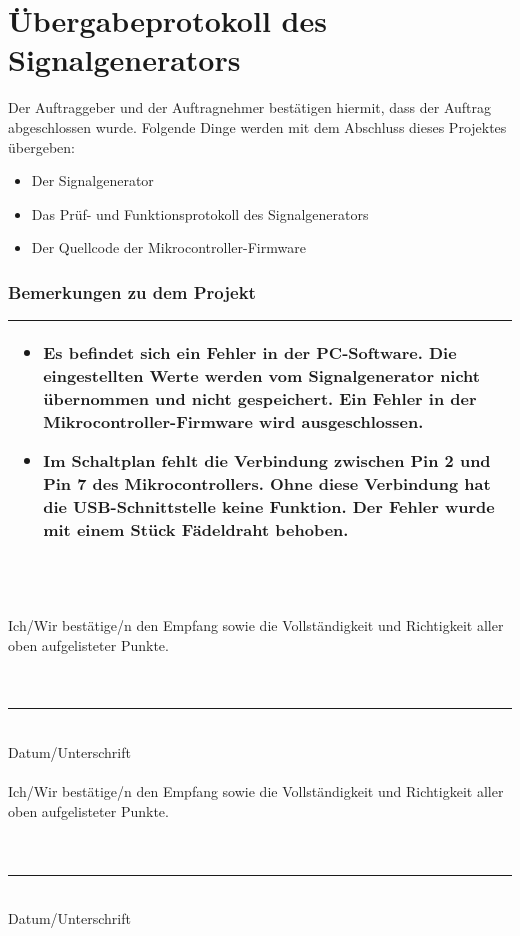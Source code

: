 \section[Übergabeprotokoll, Teilauftrag Signalgenerator]{Übergabeprotokoll des Signalgenerators}
\bigskip
Der Auftraggeber und der Auftragnehmer bestätigen hiermit, dass der Auftrag abgeschlossen wurde. Folgende Dinge werden mit dem Abschluss dieses Projektes übergeben:
\begin{itemize}
\item Der Signalgenerator
\item Das Prüf- und Funktionsprotokoll des Signalgenerators
\item Der Quellcode der Mikrocontroller-Firmware
\end{itemize}
\bigskip
\subsubsection*{Bemerkungen zu dem Projekt}

\begin{tabular}{|p{\textwidth}|}
\hline
\begin{itemize}
\item Es befindet sich ein Fehler in der PC-Software. Die eingestellten Werte werden vom Signalgenerator nicht übernommen und nicht gespeichert. Ein Fehler in der Mikrocontroller-Firmware wird ausgeschlossen.
\item Im Schaltplan fehlt die Verbindung zwischen Pin 2 und Pin 7 des Mikrocontrollers. Ohne diese Verbindung hat die USB-Schnittstelle keine Funktion. Der Fehler wurde mit einem Stück Fädeldraht behoben.
\end{itemize}
~\\
\hline
\end{tabular}

\bigskip
\bigskip
Ich/Wir bestätige/n den Empfang sowie die Vollständigkeit und Richtigkeit aller oben aufgelisteter Punkte.\\
\bigskip \\
\bigskip \\
\rule{5cm}{0.5mm}~\\
Datum/Unterschrift\\
\bigskip \\
Ich/Wir bestätige/n den Empfang sowie die Vollständigkeit und Richtigkeit aller oben aufgelisteter Punkte.\\
\bigskip \\
\bigskip \\
\rule{5cm}{0.5mm}~\\
Datum/Unterschrift
